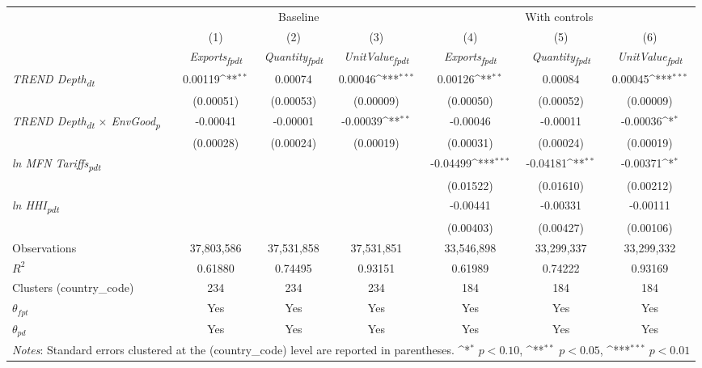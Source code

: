 {
\def\sym#1{\ifmmode^{#1}\else\(^{#1}\)\fi}
\begin{tabular}{l*{6}{c}}
\toprule
&\multicolumn{3}{c}{Baseline}&\multicolumn{3}{c}{With controls}\\\cmidrule(lr){2-4}\cmidrule(lr){5-7}
&(1)&(2)&(3)&(4)&(5)&(6)\\
&\textit{Exports\textsubscript{fpdt}}&\textit{Quantity\textsubscript{fpdt}}&\textit{UnitValue\textsubscript{fpdt}}&\textit{Exports\textsubscript{fpdt}}&\textit{Quantity\textsubscript{fpdt}}&\textit{UnitValue\textsubscript{fpdt}}\\
\midrule
\textit{TREND Depth\textsubscript{dt}} & 0.00119\sym{**} & 0.00074 & 0.00046\sym{***} & 0.00126\sym{**} & 0.00084 & 0.00045\sym{***}\\
 & (0.00051) & (0.00053) & (0.00009) & (0.00050) & (0.00052) & (0.00009)\\
\addlinespace
\textit{TREND Depth\textsubscript{dt} $\times$ EnvGood\textsubscript{p}} & -0.00041 & -0.00001 & -0.00039\sym{**} & -0.00046 & -0.00011 & -0.00036\sym{*}\\
 & (0.00028) & (0.00024) & (0.00019) & (0.00031) & (0.00024) & (0.00019)\\
\addlinespace
\textit{ln MFN Tariffs\textsubscript{pdt}} &  &  &  & -0.04499\sym{***} & -0.04181\sym{**} & -0.00371\sym{*}\\
 &  &  &  & (0.01522) & (0.01610) & (0.00212)\\
\addlinespace
\textit{ln HHI\textsubscript{pdt}} &  &  &  & -0.00441 & -0.00331 & -0.00111\\
 &  &  &  & (0.00403) & (0.00427) & (0.00106)\\
\midrule
Observations & 37,803,586 & 37,531,858 & 37,531,851 & 33,546,898 & 33,299,337 & 33,299,332\\
$R^{2}$ & 0.61880 & 0.74495 & 0.93151 & 0.61989 & 0.74222 & 0.93169\\
Clusters (country_code) & 234 & 234 & 234 & 184 & 184 & 184\\
$\theta_{fpt}$ & Yes & Yes & Yes & Yes & Yes & Yes\\
$\theta_{pd}$ & Yes & Yes & Yes & Yes & Yes & Yes\\
\bottomrule
\multicolumn{7}{l}{\footnotesize \textit{Notes}: Standard errors clustered at the (country_code) level are reported in parentheses. \sym{*} \(p<0.10\), \sym{**} \(p<0.05\), \sym{***} \(p<0.01\)}\\
\end{tabular}
}
